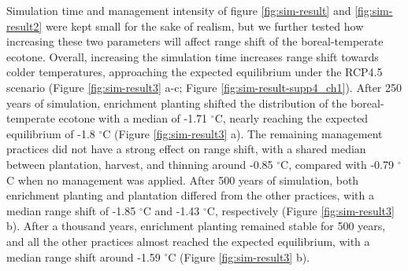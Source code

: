 Simulation time and management intensity of figure \ref{fig:sim-result}
and \ref{fig:sim-result2} were kept small for the sake of realism, but
we further tested how increasing these two parameters will affect range
shift of the boreal-temperate ecotone. Overall, increasing the
simulation time increases range shift towards colder temperatures,
approaching the expected equilibrium under the RCP4.5 scenario (Figure
\ref{fig:sim-result3} a-c; Figure \ref{fig:sim-result-supp4_ch1}). After 250 years of simulation,
enrichment planting shifted the distribution of the boreal-temperate
ecotone with a median of -1.71 \(^{\circ}\)C, nearly reaching the
expected equilibrium of -1.8 \(^{\circ}\)C (Figure \ref{fig:sim-result3}
a). The remaining management practices did not have a strong effect on
range shift, with a shared median between plantation, harvest, and
thinning around -0.85 \(^{\circ}\)C, compared with -0.79 \(^{\circ}\)C
when no management was applied. After 500 years of simulation, both
enrichment planting and plantation differed from the other practices,
with a median range shift of -1.85 \(^{\circ}\)C and -1.43
\(^{\circ}\)C, respectively (Figure \ref{fig:sim-result3} b). After a
thousand years, enrichment planting remained stable for 500 years, and
all the other practices almost reached the expected equilibrium, with a
median range shift around -1.59 \(^{\circ}\)C (Figure
\ref{fig:sim-result3} b).\\

